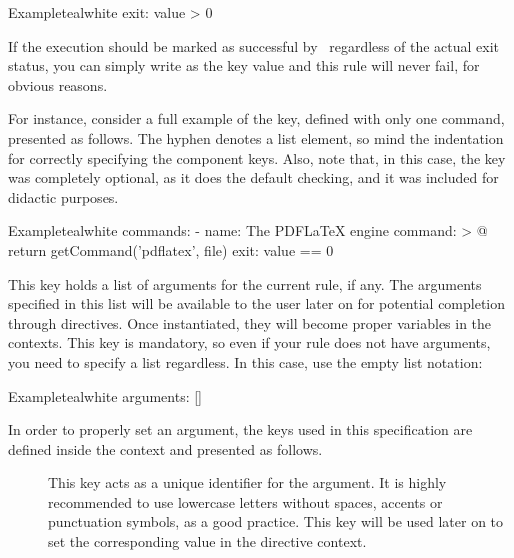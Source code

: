 \begin{description}
\begin{description}
\begin{codebox}{Example}{teal}{\icnote}{white}
exit: value > 0
\end{codebox}

If the execution should be marked as successful by \arara\ regardless of the actual exit status, you can simply write  as the key value and this rule will never fail, for obvious reasons.
\end{description}

For instance, consider a full example of the  key, defined with only one command, presented as follows. The hyphen denotes a list element, so mind the indentation for correctly specifying the component keys. Also, note that, in this case, the  key was completely optional, as it does the default checking, and it was included for didactic purposes.

\begin{codebox}{Example}{teal}{\icnote}{white}
commands:
- name: The PDFLaTeX engine
  command: >
    @{
      return getCommand('pdflatex', file)
    }
  exit: value == 0
\end{codebox}

\item[\describe{M}{arguments}] This key holds a list of arguments for the current rule, if any. The arguments specified in this list will be available to the user later on for potential completion through directives. Once instantiated, they will become proper variables in the  contexts. This key is mandatory, so even if your rule does not have arguments, you need to specify a list regardless. In this case, use the empty list notation:

\begin{codebox}{Example}{teal}{\icnote}{white}
arguments: []
\end{codebox}

In order to properly set an argument, the keys used in this specification are defined inside the  context and presented as follows.

\begin{description}
\item[] This key acts as a unique identifier for the argument. It is highly recommended to use lowercase letters without spaces, accents or punctuation symbols, as a good practice. This key will be used later on to set the corresponding value in the directive context.


\end{description}
\end{description}
